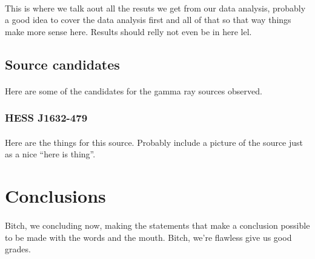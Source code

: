 \documentclass[a4paper, titlepage, oneside]{article}
\begin{document}
\begin{multicols}{2}
\paragraph{}
This is where we talk aout all the resuts we get from our data analysis, probably a good idea to cover the data analysis first and all of that so that way things make more sense here. Results should relly not even be in here lel.

\subsection{Source candidates}
\paragraph{}
Here are some of the candidates for the gamma ray sources observed.

\subsubsection{HESS J1632-479}
\paragraph{}
Here are the things for this source. Probably include a picture of the source just as a nice ``here is thing''.

\section{Conclusions}
\paragraph{}
Bitch, we concluding now, making the statements that make a conclusion possible to be made with the words and the mouth. Bitch, we're flawless give us good grades.
\end{multicols}

\printbibliography[heading = bibintoc]
\end{document}
